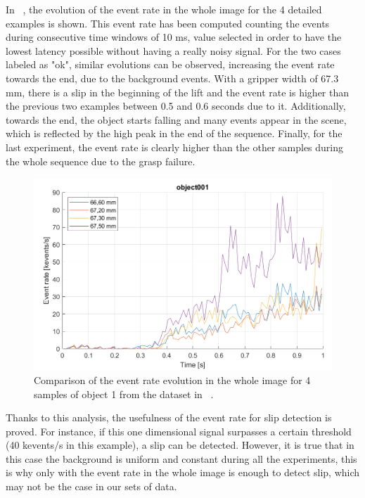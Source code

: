 In ~, the evolution of the event rate in the whole image for the 4 detailed examples is shown. This event rate has been computed counting the events during consecutive time windows of 10 ms, value selected in order to have the lowest latency possible without having a really noisy signal. For the two cases labeled as "ok", similar evolutions can be observed, increasing the event rate towards the end, due to the background events. With a gripper width of 67.3 mm, there is a slip in the beginning of the lift and the event rate is higher than the previous two examples between 0.5 and 0.6 seconds due to it. Additionally, towards the end, the object starts falling and many events appear in the scene, which is reflected by the high peak in the end of the sequence. Finally, for the last experiment, the event rate is clearly higher than the other samples during the whole sequence due to the grasp failure.\\

\begin{figure}[h]
    \centering
    \includegraphics[width=\textwidth]{resources/images/gelsight_evr}
    \caption{Comparison of the event rate evolution in the whole image for 4 samples of object 1 from the dataset in ~\cite{gelsight2018}.}\label{fig:gelsight_evr}
\end{figure}

Thanks to this analysis, the usefulness of the event rate for slip detection is proved. For instance, if this one dimensional signal surpasses a certain threshold (40 kevents/s in this example), a slip can be detected. However, it is true that in this case the background is uniform and constant during all the experiments, this is why only with the event rate in the whole image is enough to detect slip, which may not be the case in our sets of data.\\

